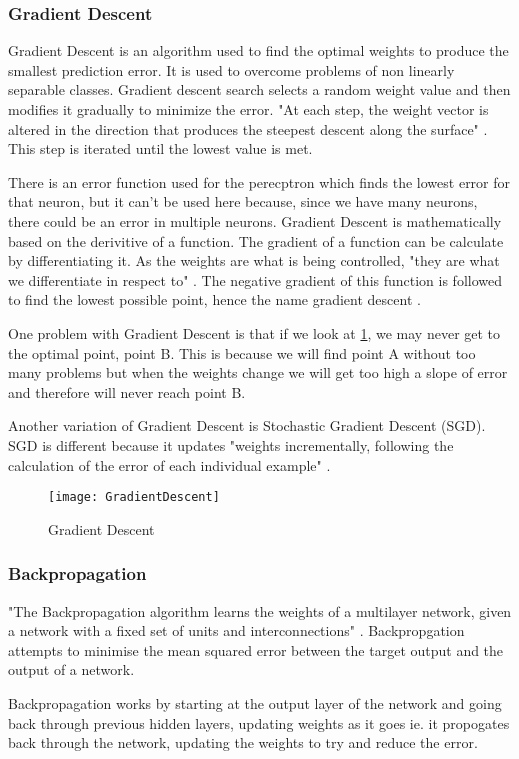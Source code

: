 \subsubsection*{Gradient Descent}
Gradient Descent is an algorithm used to find the optimal weights to produce the
smallest prediction error. It is used to overcome problems of non linearly
separable classes. Gradient descent search selects a random weight value and
then modifies it gradually to minimize the error. "At each step, the weight
vector is altered in the direction that produces the steepest descent along the
surface" \textcite{MLANN}. This step is iterated until the lowest value is met.

There is an error function used for the perecptron which finds the lowest error for that neuron, but it can't be used here because, since we have many neurons, there could be an error in multiple neurons.
Gradient Descent is mathematically based on the derivitive of a function.
The gradient of a function can be calculate by differentiating it.
As the weights are what is being controlled, "they are what we differentiate in respect to" \textcite{MLAlgorithm}.
The negative gradient of this function is followed to find the lowest possible point, hence the name gradient descent \textcite{MLAlgorithm}.

One problem with Gradient Descent is that if we look at \ref{fig:GD}, we may
never get to the optimal point, point B. This is because we will find point A
without too many problems but when the weights change we will get too high a
slope of error and therefore will never reach point B.

Another variation of Gradient Descent is Stochastic Gradient Descent (SGD). SGD
is different because it updates "weights incrementally, following the
calculation of the error of each individual example" \textcite{MLANN}. 

\begin{figure}
      \texttt{[image: GradientDescent]}
      \caption{Gradient Descent}
      \label{fig:GD}
 \end{figure}

\subsubsection*{Backpropagation}
"The Backpropagation algorithm learns the weights of a multilayer network,
given a network with a fixed set of units and interconnections" \textcite{MLANN}.
Backpropgation attempts to minimise the mean squared error between the target
output and the output of a network.

Backpropagation works by starting at the output layer of the network and going
back through previous hidden layers, updating weights as it goes ie. it propogates back through the network, updating the weights to try and reduce the error.
